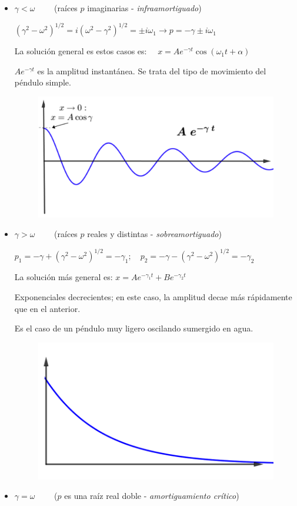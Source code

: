 \begin{itemize}
\item $\gamma < \omega \qquad$ (raíces $p$ imaginarias - \emph{infraamortiguado})

$(\gamma^2-\omega^2)^{1/2}=i(\omega^2-\gamma^2)^{1/2}=\pm i \omega_1 \to p=-\gamma \pm i \omega_1$

\begin{multicols}{2}
La solución general es estos casos es: $\quad x=Ae^{-\gamma t}\cos(\omega_1t+\alpha)$

$A e^{-\gamma t}$ es la amplitud instantánea. Se trata del tipo de movimiento del péndulo simple.
\begin{figure}[H]
		\centering
		\includegraphics[width=.5\textwidth]{imagenes/imagenes20/T20IM03.png}
	\end{figure}
\end{multicols}

\item $\gamma > \omega \qquad$ (raíces $p$ reales y distintas - \emph{sobreamortiguado})

$p_1=-\gamma + (\gamma^2-\omega^2)^{1/2}=-\gamma_1; \quad
p_2=-\gamma - (\gamma^2-\omega^2)^{1/2}=-\gamma_2 $

La solución más general es: $x=Ae^{-\gamma_1 t}+Be^{-\gamma_2 t}$

\begin{multicols}{2}
Exponenciales decrecientes; en este caso, la amplitud decae más rápidamente que en el anterior.

Es el caso de un péndulo muy ligero oscilando sumergido en agua.
\begin{figure}[H]
		\centering
		\includegraphics[width=.5\textwidth]{imagenes/imagenes20/T20IM04.png}
	\end{figure}
\end{multicols}
\item $\gamma = \omega \qquad$	($p$ es una raíz real doble - \emph{amortiguamiento crítico})


\end{itemize}
